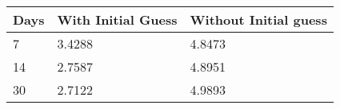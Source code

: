 \begin{tabular}{lll}
Days & With Initial Guess & Without Initial guess \\ 
\hline 
7 & 3.4288 & 4.8473 \\ 
14 & 2.7587 & 4.8951 \\ 
30 & 2.7122 & 4.9893 \\ 
\hline 
\end{tabular}